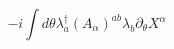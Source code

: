 \begin{equation}
-i\int d\theta\lambda^\dag_a
(A_\alpha)^{ab}\lambda_b\partial_\theta X^\alpha
\end{equation}

